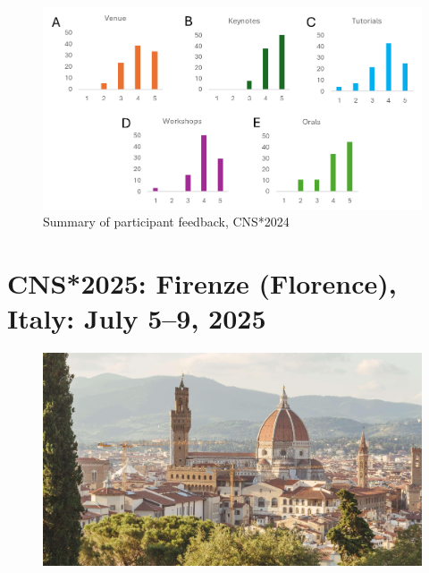\documentclass[11pt,a4paper,oneside]{article}
\begin{document}
\begin{figure}[!h]
  \centering
  \includegraphics[width=\textwidth]{images/cns2024-feedback-form-summary}
  \caption{Summary of participant feedback, CNS*2024}%
  \label{fig:cns2024-summary}
\end{figure}


\clearpage

\section*{CNS*2025: Firenze (Florence), Italy: July 5--9, 2025}%

\begin{figure}[ht]
  \centering
  \includegraphics[width=\textwidth]{images/cns2025-florence}
\end{figure}
\end{document}
